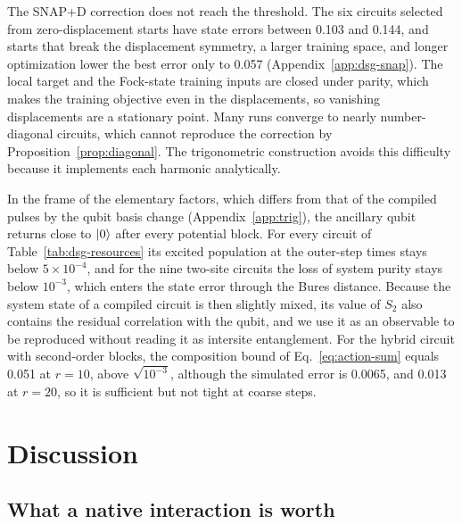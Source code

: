\documentclass[pra,twocolumn,superscriptaddress,nofootinbib,floatfix]{revtex4-2}
\theoremstyle{remark}
\newcommand{\revcolor}{\color{blue}}
\DeclareRobustCommand{\rev}[1]{{\revcolor #1}}
\begin{document}
\rev{The SNAP+D correction does not reach the threshold.} \rev{The six circuits selected from zero-displacement starts have state errors between 0.103 and 0.144, and starts that break the displacement symmetry, a larger training space, and longer optimization lower the best error only to 0.057 (Appendix~\ref{app:dsg-snap}).} \rev{The local target and the Fock-state training inputs are closed under parity, which makes the training objective even in the displacements, so vanishing displacements are a stationary point.} \rev{Many runs converge to nearly number-diagonal circuits, which cannot reproduce the correction by Proposition~\ref{prop:diagonal}.} \rev{The trigonometric construction avoids this difficulty because it implements each harmonic analytically.}

\rev{In the frame of the elementary factors, which differs from that of the compiled pulses by the qubit basis change (Appendix~\ref{app:trig}), the ancillary qubit returns close to \(\ket0\) after every potential block.} \rev{For every circuit of Table~\ref{tab:dsg-resources} its excited population at the outer-step times stays below \(5\times10^{-4}\), and for the nine two-site circuits the loss of system purity stays below \(10^{-3}\), which enters the state error through the Bures distance.} \rev{Because the system state of a compiled circuit is then slightly mixed, its value of \(S_2\) also contains the residual correlation with the qubit, and we use it as an observable to be reproduced without reading it as intersite entanglement.} \rev{For the hybrid circuit with second-order blocks, the composition bound of Eq.~\eqref{eq:action-sum} equals 0.051 at \(r=10\), above \(\sqrt{10^{-3}}\), although the simulated error is 0.0065, and 0.013 at \(r=20\), so it is sufficient but not tight at coarse steps.}


\section{\rev{Discussion}}
\label{sec:discussion}

\subsection{\rev{What a native interaction is worth}}
\label{subsec:worth}
\end{document}
